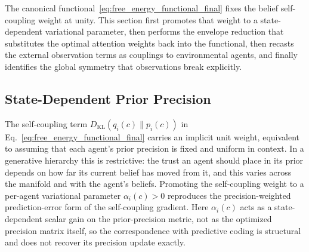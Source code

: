 \documentclass[11pt]{article}
\begin{document}
The canonical functional~\eqref{eq:free_energy_functional_final} fixes the belief self-coupling weight at unity. This section first promotes that weight to a state-dependent variational parameter, then performs the envelope reduction that substitutes the optimal attention weights back into the functional, then recasts the external observation terms as couplings to environmental agents, and finally identifies the global symmetry that observations break explicitly.

\subsection{State-Dependent Prior Precision}
\label{sec:state_dependent_precision}

The self-coupling term $D_{\mathrm{KL}}(q_i(c)\|p_i(c))$ in Eq.~\eqref{eq:free_energy_functional_final} carries an implicit unit weight, equivalent to assuming that each agent's prior precision is fixed and uniform in context. In a generative hierarchy this is restrictive: the trust an agent should place in its prior depends on how far its current belief has moved from it, and this varies across the manifold and with the agent's beliefs. Promoting the self-coupling weight to a per-agent variational parameter $\alpha_i(c) > 0$ reproduces the precision-weighted prediction-error form of the self-coupling gradient. Here $\alpha_i(c)$ acts as a state-dependent scalar gain on the prior-precision metric, not as the optimized precision matrix itself, so the correspondence with predictive coding is structural and does not recover its precision update exactly.
\end{document}
